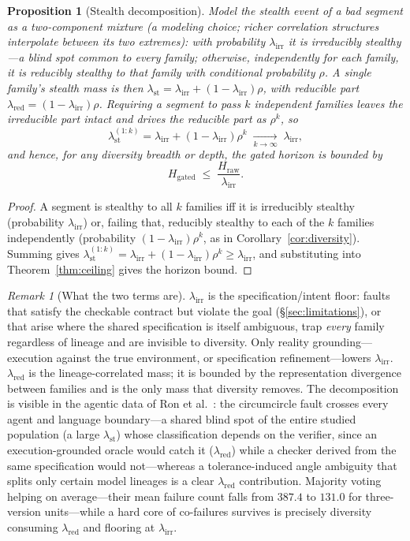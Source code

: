 \documentclass[11pt]{article}
\newtheorem{proposition}{Proposition}
\theoremstyle{remark}
\newtheorem{remark}{Remark}
\newcommand{\lst}{\lambda_{\mathrm{st}}}
\newcommand{\lred}{\lambda_{\mathrm{red}}}
\newcommand{\lirr}{\lambda_{\mathrm{irr}}}
\newcommand{\Hraw}{H_{\mathrm{raw}}}
\newcommand{\Hgated}{H_{\mathrm{gated}}}
\begin{document}
\begin{proposition}[Stealth decomposition]\label{prop:decomp}
Model the stealth event of a bad segment as a two-component mixture (a modeling choice; richer
correlation structures interpolate between its two extremes): with probability $\lirr$ it is
\emph{irreducibly} stealthy---a blind spot common to every family; otherwise, independently for
each family, it is \emph{reducibly} stealthy to that family with conditional probability $\rho$.
A single family's stealth mass is then $\lst=\lirr+(1-\lirr)\rho$, with reducible part
$\lred=(1-\lirr)\rho$.
Requiring a segment to pass $k$ independent families leaves the irreducible
part intact and drives the reducible part as $\rho^{k}$, so
\[
\lst^{(1:k)}=\lirr+(1-\lirr)\rho^{k}\;\xrightarrow[k\to\infty]{}\;\lirr,
\]
and hence, for any diversity breadth or depth, the gated horizon is bounded by
\[
\Hgated\;\le\;\frac{\Hraw}{\lirr}.
\]
\end{proposition}
\begin{proof}
A segment is stealthy to all $k$ families iff it is irreducibly stealthy (probability $\lirr$) or,
failing that, reducibly stealthy to each of the $k$ families independently (probability
$(1-\lirr)\rho^{k}$, as in Corollary~\ref{cor:diversity}).
Summing gives
$\lst^{(1:k)}=\lirr+(1-\lirr)\rho^{k}\ge\lirr$, and substituting into Theorem~\ref{thm:ceiling}
gives the horizon bound.
\end{proof}

\begin{remark}[What the two terms are]\label{rem:decomp}
$\lirr$ is the specification/intent floor: faults that satisfy the checkable contract but violate
the goal (\S\ref{sec:limitations}), or that arise where the shared specification is itself
ambiguous, trap \emph{every} family regardless of lineage and are invisible to diversity.
Only
reality grounding---execution against the true environment, or specification refinement---lowers
$\lirr$. $\lred$ is the lineage-correlated mass;
it is bounded by the representation divergence
between families and is the only mass that diversity removes.
The decomposition is visible in the
agentic data of Ron et al.~\cite{ron2026}: the circumcircle fault crosses every agent and language
boundary---a shared blind spot of the entire studied population (a large $\lst$) whose
classification depends on the verifier, since an execution-grounded oracle would catch it
($\lred$) while a checker derived from the same specification would not---whereas a
tolerance-induced angle ambiguity that splits only certain model lineages is a clear $\lred$
contribution.
Majority voting helping on average---their mean
failure count falls from $387.4$ to $131.0$ for three-version units---while a hard core of
co-failures survives is precisely diversity consuming $\lred$ and flooring at $\lirr$.
\end{remark}
\end{document}
